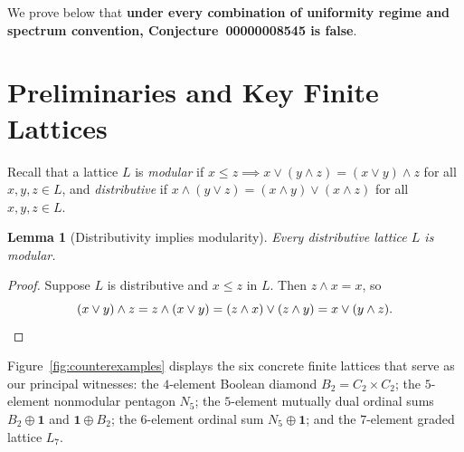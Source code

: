 \documentclass[11pt,a4paper]{article}
\newtheorem{lemma}[theorem]{Lemma}
\theoremstyle{definition}
\theoremstyle{remark}
\begin{document}
We prove below that \textbf{under every combination of uniformity regime and spectrum convention, Conjecture~00000008545 is false}.

\section{Preliminaries and Key Finite Lattices}

Recall that a lattice $L$ is \emph{modular} if $x \le z \implies x \vee (y \wedge z) = (x \vee y) \wedge z$ for all $x, y, z \in L$, and \emph{distributive} if $x \wedge (y \vee z) = (x \wedge y) \vee (x \wedge z)$ for all $x, y, z \in L$.

\begin{lemma}[Distributivity implies modularity]\label{lem:dist-mod}
Every distributive lattice $L$ is modular.
\end{lemma}
\begin{proof}
Suppose $L$ is distributive and $x \le z$ in $L$. Then $z \wedge x = x$, so
\[
  (x \vee y) \wedge z = z \wedge (x \vee y) = (z \wedge x) \vee (z \wedge y) = x \vee (y \wedge z). \qedhere
\]
\end{proof}

Figure~\ref{fig:counterexamples} displays the six concrete finite lattices that serve as our principal witnesses: the $4$-element Boolean diamond $B_2 = C_2 \times C_2$; the $5$-element nonmodular pentagon $N_5$; the $5$-element mutually dual ordinal sums $B_2 \oplus \mathbf{1}$ and $\mathbf{1} \oplus B_2$; the $6$-element ordinal sum $N_5 \oplus \mathbf{1}$; and the $7$-element graded lattice $L_7$.
\end{document}

